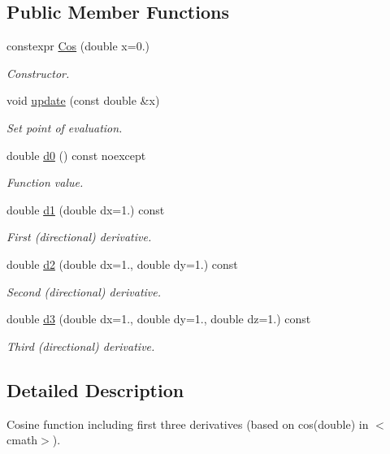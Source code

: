 \subsection*{Public Member Functions}
\begin{DoxyCompactItemize}
\item 
constexpr \hyperlink{structFunG_1_1Cos_a40c049c8842e387ccc5ab5f3720c938e}{Cos} (double x=0.)
\begin{DoxyCompactList}\small\item\em Constructor. \end{DoxyCompactList}\item 
void \hyperlink{structFunG_1_1Cos_a502c2a5f9f7e055e00192d185a5a0a50}{update} (const double \&x)
\begin{DoxyCompactList}\small\item\em Set point of evaluation. \end{DoxyCompactList}\item 
double \hyperlink{structFunG_1_1Cos_af1391a01b4031ebeb9a2db8127486127}{d0} () const noexcept
\begin{DoxyCompactList}\small\item\em Function value. \end{DoxyCompactList}\item 
double \hyperlink{structFunG_1_1Cos_a0d3494ce7fda10e3f64a2790d64c3b31}{d1} (double dx=1.) const 
\begin{DoxyCompactList}\small\item\em First (directional) derivative. \end{DoxyCompactList}\item 
double \hyperlink{structFunG_1_1Cos_ad48e6be302369c1fefbe29687823a617}{d2} (double dx=1., double dy=1.) const 
\begin{DoxyCompactList}\small\item\em Second (directional) derivative. \end{DoxyCompactList}\item 
double \hyperlink{structFunG_1_1Cos_abda328f29bee29f2af535c5f307de9c8}{d3} (double dx=1., double dy=1., double dz=1.) const 
\begin{DoxyCompactList}\small\item\em Third (directional) derivative. \end{DoxyCompactList}\end{DoxyCompactItemize}


\subsection{Detailed Description}
Cosine function including first three derivatives (based on cos(double) in $<$cmath$>$). 


